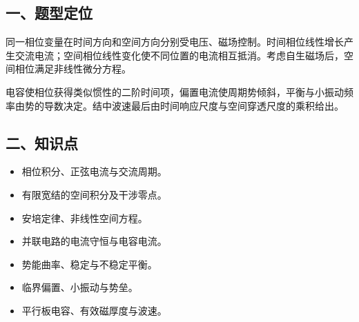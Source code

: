 \documentclass[12pt,a4paper,fontset=fandol]{ctexart}
\providecommand{\tightlist}{\setlength{\itemsep}{0pt}\setlength{\parskip}{0pt}}
\begin{document}
\begin{center}
\begin{minipage}{\linewidth}
\centering\begingroup
{}
\ifdim\wd\diagrambox>.88\linewidth
\sbox{\diagrambox}{\resizebox{.88\linewidth}{!}{\usebox{\diagrambox}}}
\fi
\ifdim\ht\diagrambox>.40\textheight
\resizebox{!}{.40\textheight}{\usebox{\diagrambox}}
\else\usebox{\diagrambox}\fi
\par{}
\endgroup\end{minipage}
\end{center}

\subsection{一、题型定位}\label{ux4e00ux9898ux578bux5b9aux4f4d-4}

同一相位变量在时间方向和空间方向分别受电压、磁场控制。时间相位线性增长产生交流电流；空间相位线性变化使不同位置的电流相互抵消。考虑自生磁场后，空间相位满足非线性微分方程。

电容使相位获得类似惯性的二阶时间项，偏置电流使周期势倾斜，平衡与小振动频率由势的导数决定。结中波速最后由时间响应尺度与空间穿透尺度的乘积给出。

\subsection{二、知识点}\label{ux4e8cux77e5ux8bc6ux70b9-4}

\begin{itemize}
\tightlist
\item
  相位积分、正弦电流与交流周期。
\item
  有限宽结的空间积分及干涉零点。
\item
  安培定律、非线性空间方程。
\item
  并联电路的电流守恒与电容电流。
\item
  势能曲率、稳定与不稳定平衡。
\item
  临界偏置、小振动与势垒。
\item
  平行板电容、有效磁厚度与波速。
\end{itemize}
\end{document}
